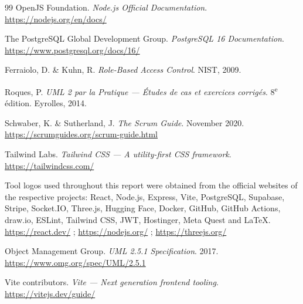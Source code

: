 \documentclass[12pt, a4paper, oneside]{report}
\begin{document}
\begin{thebibliography}{99}
OpenJS Foundation. \textit{Node.js Official Documentation}.\\
\url{https://nodejs.org/en/docs/} 

The PostgreSQL Global Development Group. \textit{PostgreSQL 16 Documentation}.\\
\url{https://www.postgresql.org/docs/16/} 

Ferraiolo, D. \& Kuhn, R. \textit{Role-Based Access Control}. NIST, 2009.

Roques, P. \textit{UML 2 par la Pratique --- Études de cas et exercices corrigés}.
8\textsuperscript{e} édition. Eyrolles, 2014.

Schwaber, K. \& Sutherland, J. \textit{The Scrum Guide}. November 2020.\\
\url{https://scrumguides.org/scrum-guide.html} 

Tailwind Labs. \textit{Tailwind CSS --- A utility-first CSS framework}.\\
\url{https://tailwindcss.com/} 

Tool logos used throughout this report were obtained from the official websites
of the respective projects: React, Node.js, Express, Vite, PostgreSQL, Supabase,
Stripe, Socket.IO, Three.js, Hugging Face, Docker, GitHub, GitHub Actions,
draw.io, ESLint, Tailwind CSS, JWT, Hostinger, Meta Quest and \LaTeX.\\
\url{https://react.dev/} ; \url{https://nodejs.org/} ; \url{https://threejs.org/}

Object Management Group. \textit{UML 2.5.1 Specification}. 2017.\\
\url{https://www.omg.org/spec/UML/2.5.1} 

Vite contributors. \textit{Vite --- Next generation frontend tooling}.\\
\url{https://vitejs.dev/guide/} 

\end{thebibliography}

\clearpage

\end{document}
